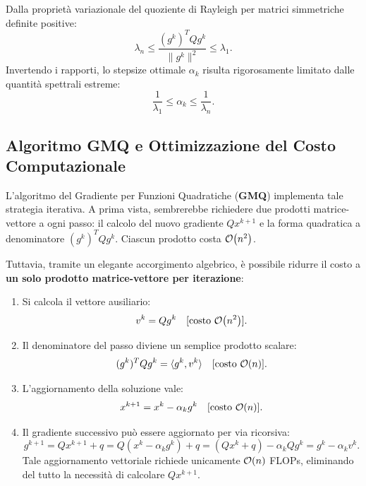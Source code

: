 \begin{property}
Dalla propriet\`a variazionale del quoziente di Rayleigh per matrici simmetriche definite positive:
\begin{equation}
    \lambda_n \le \frac{(g^k)^T Q g^k}{\|g^k\|^2} \le \lambda_1.
\end{equation}
Invertendo i rapporti, lo stepsize ottimale $\alpha_k$ risulta rigorosamente limitato dalle quantit\`a spettrali estreme:
\begin{equation}
    \frac{1}{\lambda_1} \le \alpha_k \le \frac{1}{\lambda_n}.
\end{equation}
\end{property}

\subsection{Algoritmo GMQ e Ottimizzazione del Costo Computazionale}
L'algoritmo del Gradiente per Funzioni Quadratiche (\textbf{GMQ}) implementa tale strategia iterativa. A prima vista, sembrerebbe richiedere due prodotti matrice-vettore a ogni passo: il calcolo del nuovo gradiente $Q x^{k+1}$ e la forma quadratica a denominatore $(g^k)^T Q g^k$. Ciascun prodotto costa $\mathcal{O}\!\left(n^2\right)$.

Tuttavia, tramite un elegante accorgimento algebrico, \`e possibile ridurre il costo a \textbf{un solo prodotto matrice-vettore per iterazione}:
\begin{enumerate}
    \item Si calcola il vettore ausiliario:
    \begin{equation}
        v^k = Q g^k \quad [\text{costo } \mathcal{O}\!\left(n^2\right)].
    \end{equation}
    \item Il denominatore del passo diviene un semplice prodotto scalare:
    \begin{equation}
        (g^k)^T Q g^k = \langle g^k, v^k \rangle \quad [\text{costo } \mathcal{O}\!\left(n\right)].
    \end{equation}
    \item L'aggiornamento della soluzione vale:
    \begin{equation}
        x^{k+1} = x^k - \alpha_k g^k \quad [\text{costo } \mathcal{O}\!\left(n\right)].
    \end{equation}
    \item Il gradiente successivo pu\`o essere aggiornato per via ricorsiva:
    \begin{equation}
        g^{k+1} = Q x^{k+1} + q = Q(x^k - \alpha_k g^k) + q = (Q x^k + q) - \alpha_k Q g^k = g^k - \alpha_k v^k.
    \end{equation}
    Tale aggiornamento vettoriale richiede unicamente $\mathcal{O}\!\left(n\right)$ FLOPs, eliminando del tutto la necessit\`a di calcolare $Q x^{k+1}$.
\end{enumerate}

